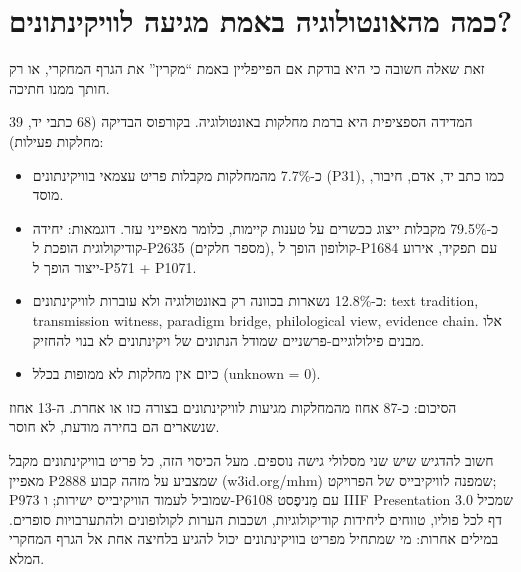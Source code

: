 \documentclass[12pt,a4paper]{article}
\begin{document}
\section{\texthebrew{כמה מהאונטולוגיה באמת מגיעה לוויקינתונים?}}
\begin{hebrew}
זאת שאלה חשובה כי היא בודקת אם הפייפליין באמת ``מקרין'' את הגרף המחקרי, או רק חותך ממנו חתיכה.
\par
המדידה הספציפית היא ברמת מחלקות באונטולוגיה. בקורפוס הבדיקה (68 כתבי יד, 39 מחלקות פעילות):
\begin{itemize}
  \item כ-7.7\% מהמחלקות מקבלות פריט עצמאי בוויקינתונים (P31), כמו כתב יד, אדם, חיבור, מוסד.
  \item כ-79.5\% מקבלות ייצוג ככשרים על טענות קיימות, כלומר מאפייני עזר. דוגמאות: יחידה קודיקולוגית הופכת ל-P2635 (מספר חלקים), קולופון הופך ל-P1684 עם תפקיד, אירוע ייצור הופך ל-P571 + P1071.
  \item כ-12.8\% נשארות בכוונה רק באונטולוגיה ולא עוברות לוויקינתונים: text tradition, transmission witness, paradigm bridge, philological view, evidence chain. אלו מבנים פילולוגיים-פרשניים שמודל הנתונים של ויקינתונים לא בנוי להחזיק.
  \item כיום אין מחלקות לא ממופות בכלל (unknown = 0).
\end{itemize}
\par
הסיכום: כ-87 אחוז מהמחלקות מגיעות לוויקינתונים בצורה כזו או אחרת. ה-13 אחוז שנשארים הם בחירה מודעת, לא חוסר.
\par
חשוב להדגיש שיש שני מסלולי גישה נוספים. מעל הכיסוי הזה, כל פריט בוויקינתונים מקבל מאפיין P2888 שמצביע על מזהה קבוע (w3id.org/mhm) שמפנה לוויקיבייס של הפרויקט; P973 שמוביל לעמוד הוויקיבייס ישירות; ו-P6108 עם מַניפֶסט IIIF Presentation 3.0 שמכיל דף לכל פוליו, טווחים ליחידות קודיקולוגיות, ושכבות הערות לקולופונים ולהתערבויות סופרים. במילים אחרות: מי שמתחיל מפריט בוויקינתונים יכול להגיע בלחיצה אחת אל הגרף המחקרי המלא.
\end{hebrew}
\end{document}
